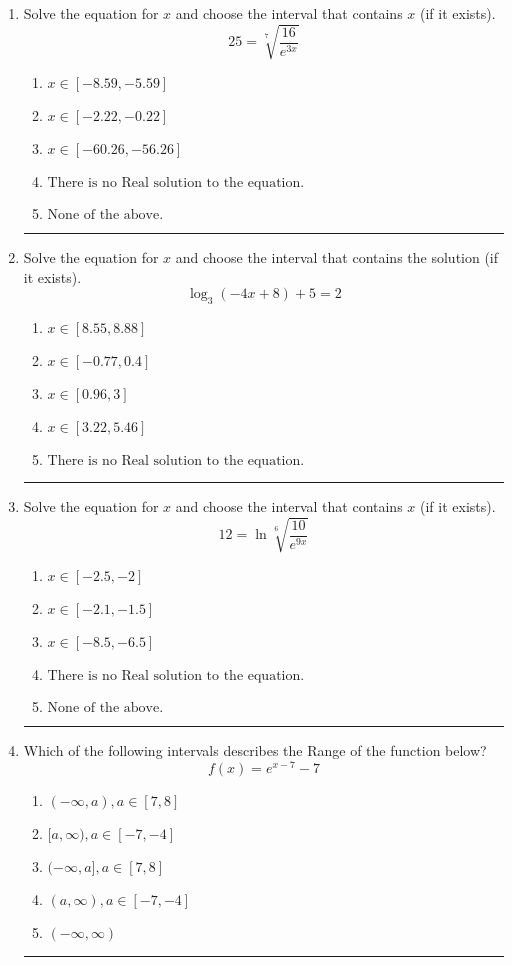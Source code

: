 \documentclass[14pt]{extbook}
\newcommand{\litem}[1]{\item#1\hspace*{-1cm}\rule{\textwidth}{0.4pt}}
\begin{document}
\begin{enumerate}
{\begin{enumerate}[label=\Alph*.]
\end{enumerate} }
\litem{
 Solve the equation for $x$ and choose the interval that contains $x$ (if it exists).\[  25 = \sqrt[7]{\frac{16}{e^{3x}}} \]\begin{enumerate}[label=\Alph*.]
\item \( x \in [-8.59, -5.59] \)
\item \( x \in [-2.22, -0.22] \)
\item \( x \in [-60.26, -56.26] \)
\item \( \text{There is no Real solution to the equation.} \)
\item \( \text{None of the above.} \)

\end{enumerate} }
\litem{
Solve the equation for $x$ and choose the interval that contains the solution (if it exists).\[ \log_{3}{(-4x+8)}+5 = 2 \]\begin{enumerate}[label=\Alph*.]
\item \( x \in [8.55, 8.88] \)
\item \( x \in [-0.77, 0.4] \)
\item \( x \in [0.96, 3] \)
\item \( x \in [3.22, 5.46] \)
\item \( \text{There is no Real solution to the equation.} \)

\end{enumerate} }
\litem{
 Solve the equation for $x$ and choose the interval that contains $x$ (if it exists).\[  12 = \ln{\sqrt[6]{\frac{10}{e^{9x}}}} \]\begin{enumerate}[label=\Alph*.]
\item \( x \in [-2.5, -2] \)
\item \( x \in [-2.1, -1.5] \)
\item \( x \in [-8.5, -6.5] \)
\item \( \text{There is no Real solution to the equation.} \)
\item \( \text{None of the above.} \)

\end{enumerate} }
\litem{
Which of the following intervals describes the Range of the function below?\[ f(x) = e^{x-7}-7 \]\begin{enumerate}[label=\Alph*.]
\item \( (-\infty, a), a \in [7, 8] \)
\item \( [a, \infty), a \in [-7, -4] \)
\item \( (-\infty, a], a \in [7, 8] \)
\item \( (a, \infty), a \in [-7, -4] \)
\item \( (-\infty, \infty) \)


\end{enumerate}}
\end{enumerate}
\end{document}
